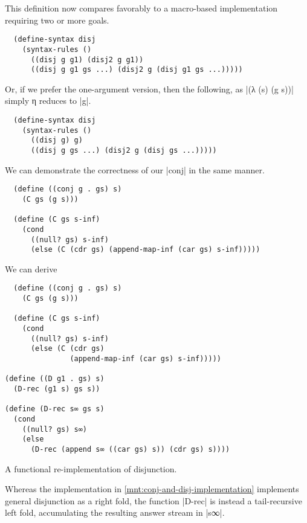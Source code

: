 \documentclass[sigplan,screen,draft,anonymous,review,natbib=false]{acmart}
\begin{document}
This definition now compares favorably to a macro-based implementation
requiring two or more goals.

\begin{verbatim}
  (define-syntax disj
    (syntax-rules ()
      ((disj g g1) (disj2 g g1))
      ((disj g g1 gs ...) (disj2 g (disj g1 gs ...)))))
\end{verbatim}

Or, if we prefer the one-argument version, then the following, as
\rackinline|(λ (s) (g s))| simply η reduces to \rackinline|g|.

\begin{verbatim}
  (define-syntax disj
    (syntax-rules ()
      ((disj g) g)
      ((disj g gs ...) (disj2 g (disj gs ...)))))
\end{verbatim}

We can demonstrate the correctness of our \rackinline|conj| in the
same manner.

\begin{verbatim}
  (define ((conj g . gs) s)
    (C gs (g s)))

  (define (C gs s-inf)
    (cond
      ((null? gs) s-inf)
      (else (C (cdr gs) (append-map-inf (car gs) s-inf)))))
\end{verbatim}

We can derive

\begin{listing}
  \begin{verbatim}
  (define ((conj g . gs) s)
    (C gs (g s)))

  (define (C gs s-inf)
    (cond
      ((null? gs) s-inf)
      (else (C (cdr gs)
               (append-map-inf (car gs) s-inf)))))

(define ((D g1 . gs) s)
  (D-rec (g1 s) gs s))

(define (D-rec s∞ gs s)
  (cond
    ((null? gs) s∞)
    (else
      (D-rec (append s∞ ((car gs) s)) (cdr gs) s))))
  \end{verbatim}
  \caption{A functional re-implementation of disjunction.}
  \label{mnt:disj-re-implementation}
\end{listing}

Whereas the implementation in
\cref{mnt:conj-and-disj-implementation} implements general disjunction
as a right fold, the function \rackinline|D-rec| is instead a
tail-recursive left fold, accumulating the resulting answer stream in
\rackinline|s∞|.
\end{document}
